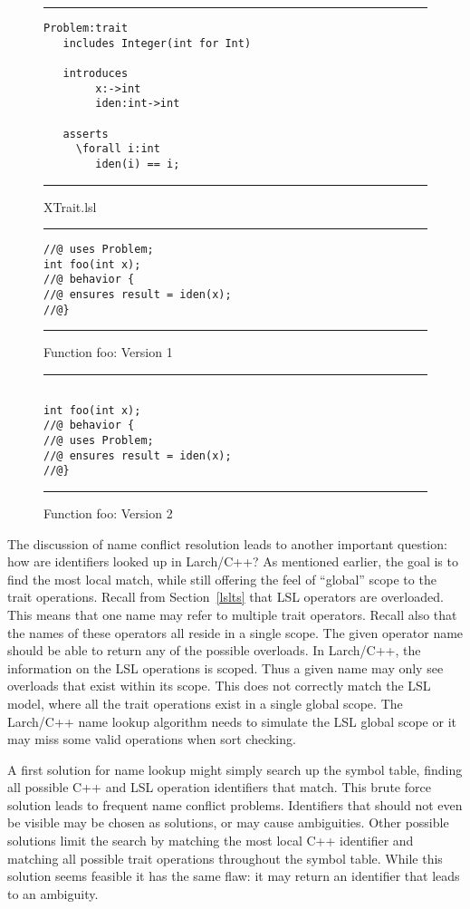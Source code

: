 \documentclass[12pt]{article} %
\newcommand{\UNSPACEFORBOX}{\vspace{-2ex}}
\newcommand{\HLINE}{\UNSPACEFORBOX%
\begin{flushleft}\rule{\textwidth}{0.01in}\end{flushleft}%
\UNSPACEFORBOX}
\newenvironment{BFIGURE}{

\begin{figure}
\small
\HLINE
}{
\HLINE
\normalsize
\end{figure}
}
\begin{document}
\begin{BFIGURE}
\begin{verbatim}
Problem:trait
   includes Integer(int for Int)

   introduces
        x:->int
        iden:int->int

   asserts
     \forall i:int
        iden(i) == i;
\end{verbatim}
\caption{XTrait.lsl}
\label{xtrait}
\end{BFIGURE}

\begin{BFIGURE}
\begin{verbatim}
//@ uses Problem;
int foo(int x);
//@ behavior {
//@ ensures result = iden(x);
//@}
\end{verbatim}
\caption{Function foo: Version 1}
\label{fooex}
\end{BFIGURE}


\begin{BFIGURE}
\begin{verbatim}

int foo(int x);
//@ behavior {
//@ uses Problem;
//@ ensures result = iden(x);
//@}
\end{verbatim}
\caption{Function foo: Version 2}
\label{fooex2}
\end{BFIGURE}

The discussion of name conflict resolution leads to another
important question: how are identifiers looked up in Larch/C++? As
mentioned earlier, the goal is to find the most local match, while
still offering the feel of ``global'' scope to the trait
operations. Recall from Section~\ref{lslts} that LSL operators are
overloaded. This means that one name may refer to multiple trait
operators. Recall also that the names of these operators all reside
in a single scope. The given operator name should be able to return
any of the possible overloads. In Larch/C++, the information on the
LSL operations is scoped. Thus a given name may only see overloads that
exist within its scope. This does not correctly match the LSL model, where
all the trait operations exist in a single global scope. The Larch/C++ name
lookup algorithm needs to simulate the LSL global scope or it may miss some
valid operations when sort checking. 

A first solution for name lookup might simply search up the symbol
table, finding all possible C++ and LSL operation identifiers that
match. This brute force solution leads to frequent name
conflict problems. Identifiers that should not even
be visible may be chosen as solutions, or may cause ambiguities. Other
possible solutions limit the search by matching the most local C++
identifier and matching all possible trait operations throughout the
symbol table. While this solution seems feasible it has the same flaw:
it may return an identifier that leads to an ambiguity.
\end{document}
